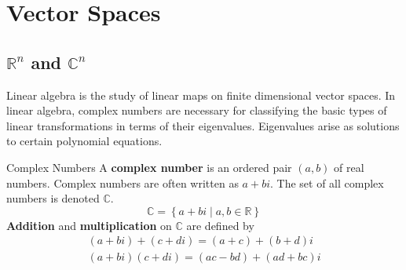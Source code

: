 \documentclass{book}
\newcommand{\real}{\mathbb{R}}
\newcommand{\complex}{\mathbb{C}}
\newcommand{\set}[2]{\left\{#1\;\vert\;#2\right\}}
\theoremstyle{definition}
\begin{document}
\chapter{Vector Spaces}

\section{$\real^n$ and $\complex^n$}
Linear algebra is the study of linear maps on finite dimensional vector spaces.
In linear algebra, complex numbers are necessary for classifying the basic types
of linear transformations in terms of their eigenvalues. Eigenvalues arise as
solutions to certain polynomial equations.

\begin{definition}{Complex Numbers}
    A \textbf{complex number} is an ordered pair $(a,b)$ of real numbers.
    Complex numbers are often written as $a+bi$. The set of all complex numbers
    is denoted $\complex$.
    \[
        \complex = \set{a+bi}{a,b\in\real}
    \]
    \textbf{Addition} and \textbf{multiplication} on $\complex$ are defined by
    \begin{gather*}
        (a+bi) + (c+di) = (a+c) + (b+d)i \\
        (a+bi)(c+di) = (ac-bd) + (ad+bc)i
    \end{gather*}
\end{definition}
\end{document}
